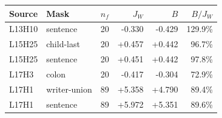 \begin{tabular}{llrrrr}
\toprule
Source & Mask & $n_f$ & $J_W$ & $B$ & $B/J_W$ \\
\midrule
L13H10 & sentence & 20 & -0.330 & -0.429 & 129.9\% \\
L15H25 & child-last & 20 & +0.457 & +0.442 & 96.7\% \\
L15H25 & sentence & 20 & +0.451 & +0.442 & 97.8\% \\
L17H3 & colon & 20 & -0.417 & -0.304 & 72.9\% \\
L17H1 & writer-union & 89 & +5.358 & +4.790 & 89.4\% \\
L17H1 & sentence & 89 & +5.972 & +5.351 & 89.6\% \\
\bottomrule
\end{tabular}
